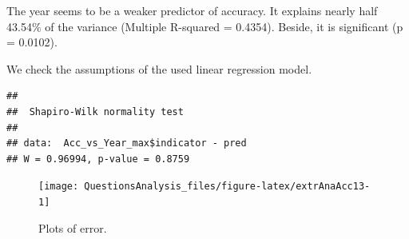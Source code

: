 \documentclass[
]{article}
\newenvironment{Shaded}{\begin{snugshade}}{\end{snugshade}}
\newcommand{\AttributeTok}[1]{\textcolor[rgb]{0.77,0.63,0.00}{#1}}
\newcommand{\ConstantTok}[1]{\textcolor[rgb]{0.00,0.00,0.00}{#1}}
\newcommand{\DecValTok}[1]{\textcolor[rgb]{0.00,0.00,0.81}{#1}}
\newcommand{\FunctionTok}[1]{\textcolor[rgb]{0.00,0.00,0.00}{#1}}
\newcommand{\NormalTok}[1]{#1}
\newcommand{\OtherTok}[1]{\textcolor[rgb]{0.56,0.35,0.01}{#1}}
\newcommand{\SpecialCharTok}[1]{\textcolor[rgb]{0.00,0.00,0.00}{#1}}
\newcommand{\StringTok}[1]{\textcolor[rgb]{0.31,0.60,0.02}{#1}}
\begin{document}
The year seems to be a weaker predictor of accuracy. It explains nearly half 43.54\% of the variance (Multiple R-squared = 0.4354). Beside, it is significant (p = 0.0102).

We check the assumptions of the used linear regression model.

\begin{Shaded}
\end{Shaded}

\begin{verbatim}
## 
##  Shapiro-Wilk normality test
## 
## data:  Acc_vs_Year_max$indicator - pred
## W = 0.96994, p-value = 0.8759
\end{verbatim}

\begin{Shaded}
\end{Shaded}

\begin{figure}

{\centering \texttt{[image: QuestionsAnalysis\_files/figure-latex/extrAnaAcc13-1]} 

}

\caption{Plots of error.}\label{fig:extrAnaAcc13-1}
\end{figure}

\begin{Shaded}
\end{Shaded}
\end{document}
